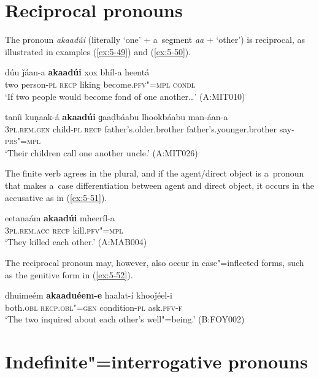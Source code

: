 \section{Reciprocal pronouns}
\label{sec:5-6}

The pronoun \textit{akaadúi} (literally `one' + a~segment \textit{aa} + `other') is reciprocal,
as illustrated in examples (\ref{ex:5-49}) and (\ref{ex:5-50}).

\begin{exe}
\ex
\label{ex:5-49}
\gll dúu ǰáan-a \textbf{akaadúi} xox bhíl-a heentá\\
two person-\textsc{pl} \textsc{recp} liking become.\textsc{pfv"=mpl} \textsc{condl}\\
\glt `If two people would become fond of one another{\ldots}' (A:MIT010)

\ex
\label{ex:5-50}
\gll taníi kuṇaak-á \textbf{akaadúi} ɡaaḍbáabu lhookbáabu man-áan-a\\
\textsc{3pl.rem.gen} child-\textsc{pl} \textsc{recp} father's.older.brother father's.younger.brother say-\textsc{prs"=mpl} \\
\glt `Their children call one another uncle.' (A:MIT026)
\end{exe}

The finite verb agrees in the plural, and if the agent/direct object is a~pronoun that makes a~case differentiation between agent and direct object, it occurs in the accusative as in (\ref{ex:5-51}).
\begin{exe}
\ex
\label{ex:5-51}
\gll eetanaám \textbf{akaadúi} mheeríl-a\\
\textsc{3pl.rem.acc} \textsc{recp } kill.\textsc{pfv"=mpl}\\
\glt `They killed each other.' (A:MAB004)
\end{exe}

The reciprocal pronoun may, however, also occur in case"=inflected forms, such as the genitive form in (\ref{ex:5-52}). 
\begin{exe}
\ex
\label{ex:5-52}
\gll dhuimeém \textbf{akaaduéem-e} haalat-í khooǰéel-i\\
both.\textsc{obl} \textsc{recp.obl"=gen } condition-\textsc{pl} ask.\textsc{pfv-f}\\
\glt `The two inquired about each other's well"=being.' (B:FOY002)
\end{exe}

\section{Indefinite"=interrogative pronouns}
\label{sec:5-7}


